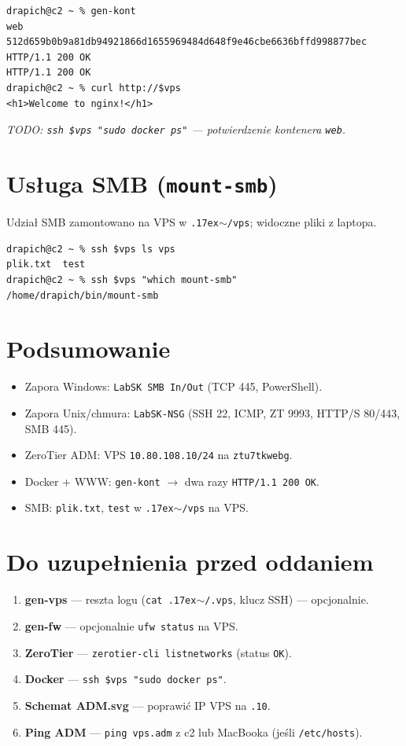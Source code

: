 \documentclass[a4paper,11pt]{article}
\newcommand\TY{\raise.17ex\hbox{$\scriptstyle\mathtt{\sim}$}}
\begin{document}
\begin{lstlisting}
drapich@c2 ~ % gen-kont
web
512d659b0b9a81db94921866d1655969484d648f9e46cbe6636bffd998877bec
HTTP/1.1 200 OK
HTTP/1.1 200 OK
drapich@c2 ~ % curl http://$vps
<h1>Welcome to nginx!</h1>
\end{lstlisting}

\textit{TODO: \texttt{ssh \$vps "sudo docker ps"} --- potwierdzenie kontenera \texttt{web}.}

\section{Usługa SMB (\texttt{mount-smb})}

Udział SMB zamontowano na VPS w \texttt{\TY/vps}; widoczne pliki z laptopa.

\begin{lstlisting}
drapich@c2 ~ % ssh $vps ls vps
plik.txt  test
drapich@c2 ~ % ssh $vps "which mount-smb"
/home/drapich/bin/mount-smb
\end{lstlisting}

\section{Podsumowanie}

\begin{itemize}
\item Zapora Windows: \texttt{LabSK SMB In/Out} (TCP 445, PowerShell).
\item Zapora Unix/chmura: \texttt{LabSK-NSG} (SSH 22, ICMP, ZT 9993, HTTP/S 80/443, SMB 445).
\item ZeroTier ADM: VPS \texttt{10.80.108.10/24} na \texttt{ztu7tkwebg}.
\item Docker + WWW: \texttt{gen-kont} $\rightarrow$ dwa razy \texttt{HTTP/1.1 200 OK}.
\item SMB: \texttt{plik.txt}, \texttt{test} w \texttt{\TY/vps} na VPS.
\end{itemize}

\section*{Do uzupełnienia przed oddaniem}

\begin{enumerate}
\item \textbf{gen-vps} --- reszta logu (\texttt{cat \TY/.vps}, klucz SSH) --- opcjonalnie.
\item \textbf{gen-fw} --- opcjonalnie \texttt{ufw status} na VPS.
\item \textbf{ZeroTier} --- \texttt{zerotier-cli listnetworks} (status \texttt{OK}).
\item \textbf{Docker} --- \texttt{ssh \$vps "sudo docker ps"}.
\item \textbf{Schemat ADM.svg} --- poprawić IP VPS na \texttt{.10}.
\item \textbf{Ping ADM} --- \texttt{ping vps.adm} z c2 lub MacBooka (jeśli \texttt{/etc/hosts}).
\end{enumerate}
\end{document}

